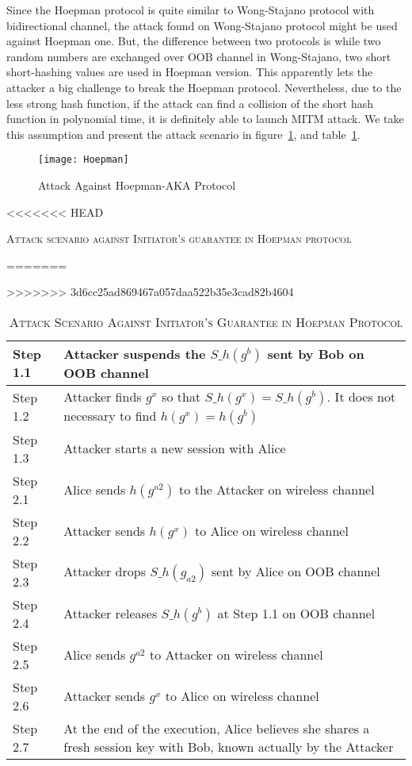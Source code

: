 Since the Hoepman protocol is quite similar to Wong-Stajano protocol with bidirectional channel, the attack found on Wong-Stajano protocol might be used against Hoepman one. But, the difference between two protocols is while two random numbers are exchanged over OOB channel in Wong-Stajano, two short short-hashing values are used in Hoepman version. This apparently lets the attacker a big challenge to break the Hoepman protocol. Nevertheless, due to the less strong hash function, if the attack can find a collision of the short hash function in polynomial time, it is definitely able to launch MITM attack. We take this assumption and present the attack scenario in figure~\ref{Hoepman}, and table~\ref{Hoepmantable}. 
   
\begin{figure}
  \centering
  \texttt{[image: Hoepman]}
  \caption{Attack Against Hoepman-AKA Protocol}
  \label{Hoepman}
\end{figure}

\begin{table}[t]
\centering
<<<<<<< HEAD
\caption{\textsc{Attack scenario against Initiator's guarantee in Hoepman protocol}}
=======
\caption{\textsc{Attack Scenario Against Initiator's Guarantee in Hoepman Protocol}}
>>>>>>> 3d6cc25ad869467a057daa522b35e3cad82b4604
\label{Hoepmantable}
{\small
\begin{tabular}{| l | p{11cm} |}
 \hline
 Step 1.1 & Attacker suspends the $S\_h(g^b)$ sent by Bob on OOB channel\\ \hline
 Step 1.2 & Attacker finds $g^x$ so that $S\_h(g^x) = S\_h(g^b)$. It does not necessary to find $h(g^x) = h(g^b)$  \\ \hline
 Step 1.3 & Attacker starts a new session with Alice\\ \hline \hline
 Step 2.1 & Alice sends $h(g^{a2})$ to the Attacker on wireless channel\\ \hline
 Step 2.2 & Attacker sends $h(g^{x})$ to Alice on wireless channel\\ \hline
 Step 2.3 & Attacker drops $S\_h(g_{a2})$ sent by Alice on OOB channel\\ \hline
 Step 2.4 & Attacker releases $S\_h(g^b)$ at Step 1.1 on OOB channel \\ \hline
 Step 2.5 & Alice sends $g^{a2}$ to Attacker on wireless channel \\ \hline
 Step 2.6 & Attacker sends $g^{x}$ to Alice on wireless channel\\ \hline
 Step 2.7 & At the end of the execution, Alice believes she shares a fresh session key with Bob, known actually by the Attacker\\ \hline
\end{tabular}
}
\end{table}

